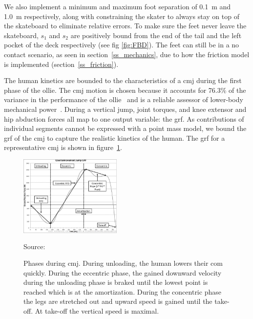 \documentclass[default,iicol]{sn-jnl}
\begin{document}
We also implement a minimum and maximum foot separation of \SI{0.1}{\meter} and \SI{1.0}{\meter} respectively, along with constraining the skater to always stay on top of the skateboard to eliminate relative errors.
To make sure the feet never leave the skateboard, $s_1$ and $s_2$ are positively bound from the end of the tail and the left pocket of the deck respectively (see fig \ref{fig:FBD}).
The feet can still be in a no contact scenario, as seen in section~\ref{ss_mechanics}, due to how the friction model is implemented (section~\ref{ss_friction}).

The human kinetics are bounded to the characteristics of a \gls{cmj} during the first phase of the ollie.
The \gls{cmj} motion is chosen because it accounts for 76.3\% of the variance in the performance of the ollie~\cite{candotti_lower_2012} and is a reliable assessor of lower-body mechanical power~\cite{barker_relationships_2018}.
During a vertical jump, joint torques, and knee extensor and hip abduction forces all map to one output variable: the \gls{grf}.
As contributions of individual segments cannot be expressed with a point mass model, we bound the \gls{grf} of the \gls{cmj} to capture the realistic kinetics of the human. The \gls{grf} for a representative \gls{cmj} is shown in figure~\ref{fig:cmj}.

\begin{figure}
    \centering
    \includegraphics[width=0.45\textwidth]{figure/countermovementjumpRFD.jpg}
    \caption[Ground reaction force of \acrlong{cmj}]{Phases during \gls{cmj}. During unloading, the human lowers their \gls{com} quickly. During the eccentric phase, the gained downward velocity during the unloading phase is braked until the lowest point is reached which is at the amortization. During the concentric phase the legs are stretched out and upward speed is gained until the take-off. At take-off the vertical speed is maximal.}
    \centering \footnotesize Source: \cite{barker_relationships_2018}%
    \label{fig:cmj}
\end{figure}
\end{document}
